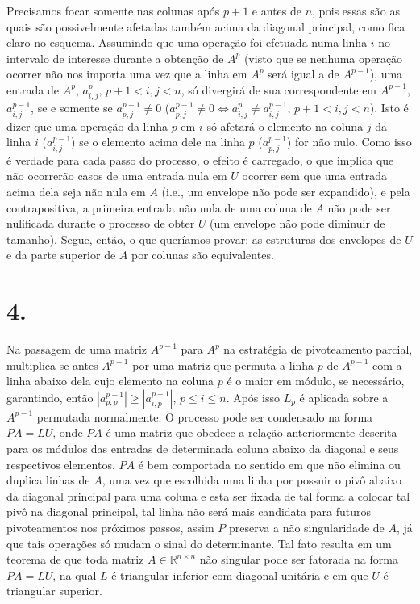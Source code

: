 \documentclass[a4paper, 12pt]{article}
\begin{document}
Precisamos focar somente nas colunas após $p+1$ e antes de $n$, pois essas são as quais são possivelmente afetadas também acima da diagonal principal, como fica claro no esquema. Assumindo que uma operação foi efetuada numa linha $i$ no intervalo de interesse durante a obtenção de $A^p$ (visto que se nenhuma operação ocorrer não nos importa uma vez que a linha em $A^p$ será igual a de $A^{p-1}$), uma entrada de $A^p$, $a^p_{i,j}\text{, }p+1<i,j<n$, só divergirá de sua correspondente em $A^{p-1}$, $a^{p-1}_{i,j}$, se e somente se $a^{p-1}_{p,j}\neq0$ ($a^{p-1}_{p,j}\neq0 \Leftrightarrow a^p_{i,j}\neq a^{p-1}_{i,j} \text{, }p+1<i,j<n$). Isto é dizer que uma operação da linha $p$ em $i$ só afetará o elemento na coluna $j$ da linha $i$ ($a^{p-1}_{i,j}$) se o elemento acima dele na linha $p$ ($a^{p-1}_{p,j}$) for não nulo. Como isso é verdade para cada passo do processo, o efeito é carregado, o que implica que não ocorrerão casos de uma entrada nula em $U$ ocorrer sem que uma entrada acima dela seja não nula em $A$ (i.e., um envelope não pode ser expandido), e pela contrapositiva, a primeira entrada não nula de uma coluna de $A$ não pode ser nulificada durante o processo de obter $U$ (um envelope não pode diminuir de tamanho). Segue, então, o que queríamos provar: as estruturas dos envelopes de $U$ e da parte superior de $A$ por colunas são equivalentes.
\section{4.}
Na passagem de uma matriz $A^{p-1}$ para $A^p$ na estratégia de pivoteamento parcial, multiplica-se antes $A^{p-1}$ por uma matriz que permuta a linha $p$ de $A^{p-1}$ com a linha abaixo dela cujo elemento na coluna $p$ é o maior em módulo, se necessário, garantindo, então $|a_{p,p}^{p-1}|\geq |a_{i,p}^{p-1}|\text{, }p\leq i \leq n$. Após isso $L_p$ é aplicada sobre a $A^{p-1}$ permutada normalmente. O processo pode ser condensado na forma $PA=LU$, onde $PA$ é uma matriz que obedece a relação anteriormente descrita para os módulos das entradas de determinada coluna abaixo da diagonal e seus respectivos elementos. $PA$ é bem comportada no sentido em que não elimina ou duplica linhas de $A$, uma vez que escolhida uma linha por possuir o pivô abaixo da diagonal principal para uma coluna e esta ser fixada de tal forma a colocar tal pivô na diagonal principal, tal linha não será mais candidata para futuros pivoteamentos nos próximos passos, assim $P$ preserva a não singularidade de $A$, já que tais operações só mudam o sinal do determinante. Tal fato resulta em um teorema de que toda matriz $A\in\mathbb{R}^{n\times n}$ não singular pode ser fatorada na forma $PA=LU$, na qual $L$ é triangular inferior com diagonal unitária e em que $U$ é triangular superior.
\end{document}
